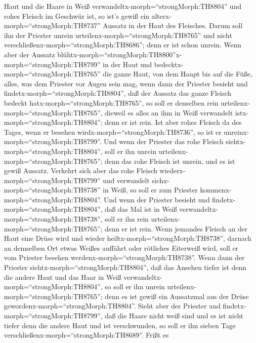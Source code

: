 Haut und die Haare in Weiß verwandeltx-morph=``strongMorph:TH8804'' und
rohes Fleisch im Geschwür ist,  so ist's gewiß ein
alterx-morph=``strongMorph:TH8737'' Aussatz in der Haut des Fleisches.
Darum soll ihn der Priester unrein
urteilenx-morph=``strongMorph:TH8765'' und nicht
verschließenx-morph=``strongMorph:TH8686''; denn er ist schon unrein.
 Wenn aber der Aussatz
blühtx-morph=``strongMorph:TH8800''x-morph=``strongMorph:TH8799'' in der
Haut und bedecktx-morph=``strongMorph:TH8765'' die ganze Haut, von dem
Haupt bis auf die Füße, alles, was dem Priester vor Augen sein mag,
 wenn dann der Priester besieht und
findetx-morph=``strongMorph:TH8804'', daß der Aussatz das ganze Fleisch
bedeckt hatx-morph=``strongMorph:TH8765'', so soll er denselben rein
urteilenx-morph=``strongMorph:TH8765'', dieweil es alles an ihm in Weiß
verwandelt istx-morph=``strongMorph:TH8804''; denn er ist rein.
 Ist aber rohes Fleisch da des Tages, wenn er besehen
wirdx-morph=``strongMorph:TH8736'', so ist er
unreinx-morph=``strongMorph:TH8799''.  Und wenn der
Priester das rohe Fleisch siehtx-morph=``strongMorph:TH8804'', soll er
ihn unrein urteilenx-morph=``strongMorph:TH8765''; denn das rohe Fleisch
ist unrein, und es ist gewiß Aussatz.  Verkehrt sich aber
das rohe Fleisch wiederx-morph=``strongMorph:TH8799'' und verwandelt
sichx-morph=``strongMorph:TH8738'' in Weiß, so soll er zum Priester
kommenx-morph=``strongMorph:TH8804''.  Und wenn der
Priester besieht und findetx-morph=``strongMorph:TH8804'', daß das Mal
ist in Weiß verwandeltx-morph=``strongMorph:TH8738'', soll er ihn rein
urteilenx-morph=``strongMorph:TH8765''; denn er ist rein. 
Wenn jemandes Fleisch an der Haut eine Drüse wird und wieder
heiltx-morph=``strongMorph:TH8738'',  darnach an demselben
Ort etwas Weißes auffährt oder rötliches Eiterweiß wird, soll er vom
Priester besehen werdenx-morph=``strongMorph:TH8738''. 
Wenn dann der Priester siehtx-morph=``strongMorph:TH8804'', daß das
Ansehen tiefer ist denn die andere Haut und das Haar in Weiß
verwandeltx-morph=``strongMorph:TH8804'', so soll er ihn unrein
urteilenx-morph=``strongMorph:TH8765''; denn es ist gewiß ein Aussatzmal
aus der Drüse gewordenx-morph=``strongMorph:TH8804''. 
Sieht aber der Priester und findetx-morph=``strongMorph:TH8799'', daß
die Haare nicht weiß sind und es ist nicht tiefer denn die andere Haut
und ist verschwunden, so soll er ihn sieben Tage
verschließenx-morph=``strongMorph:TH8689''.  Frißt es
